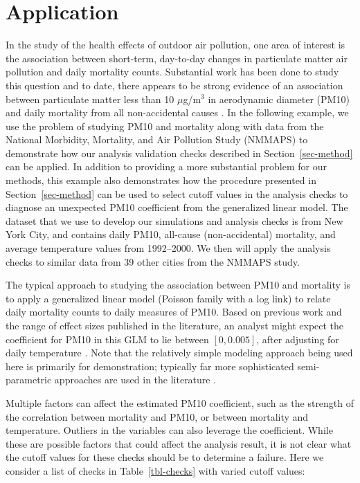 \documentclass[
  12pt,
]{interact}
\begin{document}
\section{Application}\label{sec-pm10-mortality}

In the study of the health effects of outdoor air pollution, one area of
interest is the association between short-term, day-to-day changes in
particulate matter air pollution and daily mortality counts. Substantial
work has been done to study this question and to date, there appears to
be strong evidence of an association between particulate matter less
than 10 \(\mu\)g/m\(^3\) in aerodynamic diameter (PM10) and daily
mortality from all non-accidental causes \citep{samet2000fine}. In the
following example, we use the problem of studying PM10 and mortality
along with data from the National Morbidity, Mortality, and Air
Pollution Study (NMMAPS) to demonstrate how our analysis validation
checks described in Section~\ref{sec-method} can be applied. In addition
to providing a more substantial problem for our methods, this example
also demonstrates how the procedure presented in
Section~\ref{sec-method} can be used to select cutoff values in the
analysis checks to diagnose an unexpected PM10 coefficient from the
generalized linear model. The dataset that we use to develop our
simulations and analysis checks is from New York City, and contains
daily PM10, all-cause (non-accidental) mortality, and average
temperature values from 1992--2000. We then will apply the analysis
checks to similar data from 39 other cities from the NMMAPS study.

The typical approach to studying the association between PM10 and
mortality is to apply a generalized linear model (Poisson family with a
log link) to relate daily mortality counts to daily measures of PM10.
Based on previous work and the range of effect sizes published in the
literature, an analyst might expect the coefficient for PM10 in this GLM
to lie between \([0, 0.005]\), after adjusting for daily temperature
\citep{samet2000fine, welty2005acute}. Note that the relatively simple
modeling approach being used here is primarily for demonstration;
typically far more sophisticated semi-parametric approaches are used in
the literature \citep{peng2006model}.

Multiple factors can affect the estimated PM10 coefficient, such as the
strength of the correlation between mortality and PM10, or between
mortality and temperature. Outliers in the variables can also leverage
the coefficient. While these are possible factors that could affect the
analysis result, it is not clear what the cutoff values for these checks
should be to determine a failure. Here we consider a list of checks in
Table~\ref{tbl-checks} with varied cutoff values:
\end{document}
